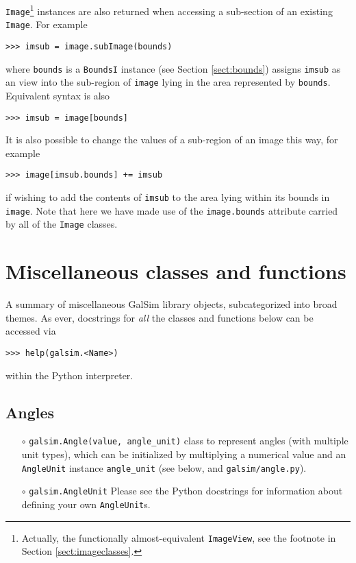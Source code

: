 \documentclass[preprint,11pt]{../../devel/modules/aastex}
\begin{document}
\texttt{Image}\footnote{Actually, the functionally almost-equivalent
  \texttt{ImageView}, see the footnote in Section
  \ref{sect:imageclasses}.}  instances are also returned when
accessing a sub-section of an existing \texttt{Image}.  For example

{\tt >>> imsub = image.subImage(bounds)}

where \texttt{bounds} is a \texttt{BoundsI} instance (see Section
\ref{sect:bounds}) assigns \texttt{imsub} as an view into
the sub-region of \texttt{image} lying in the area represented by
\texttt{bounds}.  Equivalent syntax is also

{\tt >>> imsub = image[bounds]}

It is also possible to change the values of a sub-region of an image
this way, for example

{\tt >>> image[imsub.bounds] += imsub}

if wishing to add the contents of \texttt{imsub} to the area lying
within its bounds in \texttt{image}.  Note that here we have made use of
the \texttt{image.bounds} attribute carried by all of the \texttt{Image}
classes.

\section{Miscellaneous classes and functions}\label{sect:misc}

A summary of miscellaneous GalSim library objects, subcategorized into
broad themes.  As ever, docstrings for \emph{all} the classes and
functions below can be accessed via

{\tt >>> help(galsim.<Name>)}

within the Python interpreter.

\subsection{Angles}\label{sect:angles}
\begin{itemize}

\item[$\circ$] \texttt{galsim.Angle(value, angle\_unit)} \newline
  {class to represent angles (with multiple unit types),
    which can be initialized by multiplying a numerical
    value and an \texttt{AngleUnit} instance \texttt{angle\_unit} (see
    below, and \texttt{galsim/angle.py}).}

\item[$\circ$] \texttt{galsim.AngleUnit} 
 Please see the Python docstrings for information about defining your
 own \texttt{AngleUnit}s.
\end{itemize}
\end{document}
